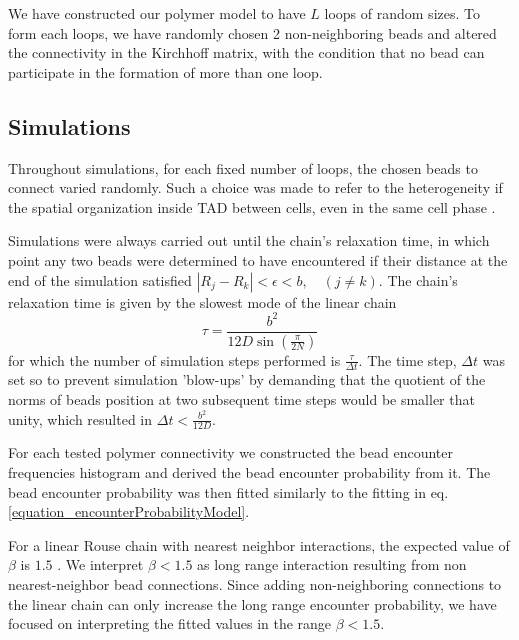 \documentclass[12pt]{paper}
\begin{document}
We have constructed our polymer model to have $L$ loops of random sizes. To form each loops, we have randomly chosen 2 non-neighboring beads and altered the connectivity in the Kirchhoff matrix, with the condition that no bead can participate in the formation of more than one loop. 

\subsection{Simulations}\label{subsection_simulations}
Throughout simulations, for each fixed number of loops, the chosen beads to connect varied randomly. Such a choice was made to refer to the heterogeneity if the spatial organization inside TAD between cells, even in the same cell phase \cite{Nora2012}.

Simulations were always carried out until the chain's relaxation time, in which point any two beads were determined to have encountered if their distance at the end of the simulation satisfied $|R_j-R_k|<\epsilon<b,\quad  (j\ne k)$. 
The chain's relaxation time is given by the slowest mode of the linear chain 
\begin{equation*}
\tau =\frac{b^2}{12D\sin(\frac{\pi}{2N})} 
\end{equation*}  
for which the number of simulation steps performed is $\frac{\tau}{\Delta t} $. The time step, $\Delta t$ was set so to prevent simulation 'blow-ups' by demanding that the quotient of the norms of beads position at two subsequent time steps would be smaller that unity, which resulted in $\Delta t < \frac{b^2}{12D}$. 

For each tested polymer connectivity we constructed the bead encounter frequencies histogram and derived the bead encounter probability from it. The bead encounter probability was then fitted similarly to the fitting in eq. \ref{equation_encounterProbabilityModel}. 

For a linear Rouse chain with nearest neighbor interactions, the expected value of $\beta$ is $1.5$ \cite{doi1986theory}. We interpret $\beta<1.5$ as long range interaction resulting from non nearest-neighbor bead connections.
Since adding non-neighboring connections to the linear chain can only increase the long range encounter probability, we have focused on interpreting the fitted values in the range $\beta<1.5$. 
\end{document}
